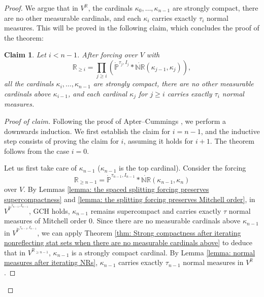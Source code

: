 \documentclass[11pt]{amsart}
\newtheorem{claim}{Claim}[theorem]
\theoremstyle{definition}
\theoremstyle{remark}
\newcommand\<{{<}}
\def\s{\subseteq}
\newcommand{\po}{\mathbb{P}}
\begin{document}
\begin{proof}
We argue that in $V^{\mathbb{R}}$, the cardinals $\kappa_0, \ldots, \kappa_{n-1}$ are strongly compact, there are no other measurable cardinals, and each $\kappa_i$ carries exactly $\tau_i$ normal measures. This will be proved in the following claim, which  concludes the proof of the theorem:
\begin{claim}
Let $i<n-1$. After forcing over $V$ with 
    $$\mathbb{R}_{\geq i} = \textstyle \prod_{j\geq i}(\dot{\mathbb{P}}^{\tau_j,I_j}\ast \dot{\mathbb{NR}}{(\kappa_{j-1},\kappa_j)}),$$
    all the cardinals $\kappa_{i}, \ldots, \kappa_{n-1}$ are strongly compact, there are no other measurable cardinals above $\kappa_{i-1}$, and each cardinal $\kappa_{j}$ for $j\geq i$ carries exactly $\tau_i$ normal measures.



    
\end{claim}
\begin{proof}[Proof of claim]
Following the proof of Apter--Cummings \cite{ApterCummingsStrongCompactness}, we perform a  downwards induction. We first establish the claim for $i = n-1$, and the inductive step consists of proving the claim for $i$, assuming it holds for $i+1$. The theorem follows from the case $i=0$.

    Let us first take care of $\kappa_{n-1}$ ($\kappa_{n-1}$ is the top cardinal). Consider the forcing $$\mathbb{R}_{\geq n-1} = \dot{\po}^{\tau_{n-1}, I_{n-1}} \ast \dot{\mathbb{NR}}(\kappa_{n-1}, \kappa_n)$$
    over $V$. 
    By Lemmas \ref{lemma: the spaced splitting forcing preserves supercompactness} and \ref{lemma: the splitting forcing preserves Mitchell order}, in $V^{\dot{\po}^{\tau_{n-1}, I_{n-1}}}$, GCH holds, $\kappa_{n-1}$ remains supercompact and carries exactly $\tau$ normal measures of Mitchell order $0$. Since there are no measurable cardinals above $\kappa_{n-1}$ in $V^{\dot{\po}^{\tau_{n-1}, I_{n-1}}}$, we can apply Theorem \ref{thm: Strong compactness after iterating nonreflecting stat sets when there are no measurable cardinals above} to deduce that in $V^{\mathbb{R}_{\geq n-1}}$, $\kappa_{n-1}$ is a strongly compact cardinal. By Lemma \ref{lemma: normal measures after iterating NRs}, $\kappa_{n-1}$ carries exactly $\tau_{n-1}$ normal measures in $V^{\mathbb{R}}$.


\end{proof}
\end{proof}
\end{document}
